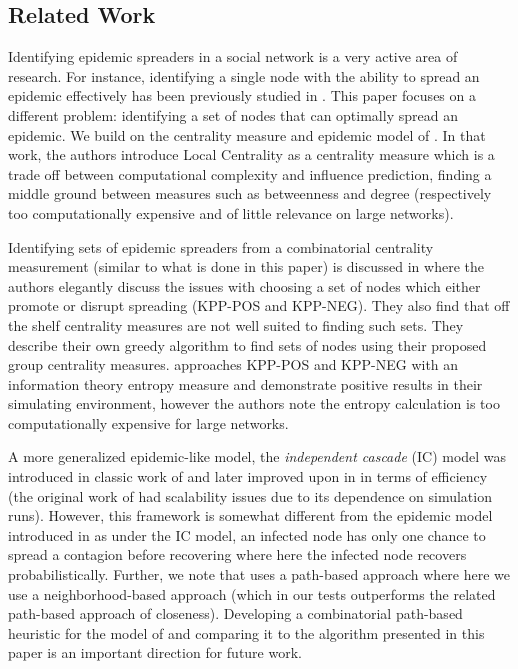 \subsection{Related Work}

Identifying epidemic spreaders in a social network is a very active area of research.  For instance, identifying a single node with the ability to spread an epidemic effectively has been previously studied in \cite{kitsak10, subrah12, klemm12, castellano12, chen12}.  This paper focuses on a different problem: identifying a set of nodes that can optimally spread an epidemic.  We build on the centrality measure and epidemic model of \cite{chen12}.  In that work, the authors introduce Local Centrality as a centrality measure which is a trade off between computational complexity and influence prediction, finding a middle ground between measures such as betweenness and degree (respectively too computationally expensive and of little relevance on large networks).

Identifying sets of epidemic spreaders from a combinatorial centrality measurement (similar to what is done in this paper) is discussed in \cite{bog06} where the authors elegantly discuss the issues with choosing a set of nodes which either promote or disrupt spreading (KPP-POS and KPP-NEG).  They also find that off the shelf centrality measures are not well suited to finding such sets.  They describe their own greedy algorithm to find sets of nodes using their proposed group centrality measures. \cite{arroyo08} approaches KPP-POS and KPP-NEG with an information theory entropy measure and demonstrate positive results in their simulating environment, however the authors note the entropy calculation is too computationally expensive for large networks.

A more generalized epidemic-like model, the \textit{independent cascade} (IC) model was introduced in classic work of \cite{kleinberg} and later improved upon in \cite{chen10} in terms of efficiency (the original work of \cite{kleinberg} had scalability issues due to its dependence on simulation runs).  However, this framework is somewhat different from the epidemic model introduced in \cite{chen12} as under the IC model, an infected node has only one chance to spread a contagion before recovering where here the infected node recovers probabilistically.  Further, we note that \cite{chen10} uses a path-based approach where here we use a neighborhood-based approach (which in our tests outperforms the related path-based approach of closeness).  Developing a combinatorial path-based heuristic for the model of \cite{chen12} and comparing it to the algorithm presented in this paper is an important direction for future work.

